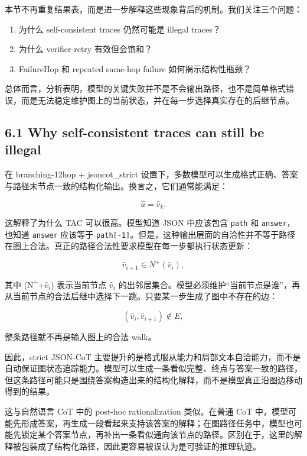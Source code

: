 \documentclass[
  11pt,
]{article}
\begin{document}
本节不再重复结果表，而是进一步解释这些现象背后的机制。我们关注三个问题：

\begin{enumerate}
\def\labelenumi{\arabic{enumi}.}
\item
  为什么 self-consistent traces 仍然可能是 illegal traces？
\item
  为什么 verifier-retry 有效但会饱和？
\item
  FailureHop 和 repeated same-hop failure 如何揭示结构性瓶颈？
\end{enumerate}

总体而言，分析表明，模型的关键失败并不是不会输出路径，也不是简单格式错误，而是无法稳定维护图上的当前状态，并在每一步选择真实存在的后继节点。

\subsection{6.1 Why self-consistent traces can still be
illegal}\label{why-self-consistent-traces-can-still-be-illegal}

在 branching-12hop + jsoncot\_strict
设置下，多数模型可以生成格式正确、答案与路径末节点一致的结构化输出。换言之，它们通常能满足：

\[
\hat{a}=\hat{v}_k.  
\]

这解释了为什么 TAC 可以很高。模型知道 JSON 中应该包含 \texttt{path} 和
\texttt{answer}，也知道 \texttt{answer} 应该等于
\texttt{path{[}-1{]}}。但是，这种输出层面的自洽性并不等于路径在图上合法。真正的路径合法性要求模型在每一步都执行状态更新：

\[
\hat{v}_{i+1}\in N^+(\hat{v}_i),  
\]

其中 (N\^{}+\(\hat{v}_i\)) 表示当前节点 \(\hat{v}_i\)
的出邻居集合。模型必须维护``当前节点是谁''，再从当前节点的合法后继中选择下一跳。只要某一步生成了图中不存在的边：

\[
(\hat{v}_i,\hat{v}_{i+1})\notin E,  
\]

整条路径就不再是输入图上的合法 walk。

因此，strict JSON-CoT
主要提升的是格式服从能力和局部文本自洽能力，而不是自动保证图状态追踪能力。模型可以生成一条看似完整、终点与答案一致的路径，但这条路径可能只是围绕答案构造出来的结构化解释，而不是模型真正沿图边移动得到的结果。

这与自然语言 CoT 中的 post-hoc rationalization 类似。在普通 CoT
中，模型可能先形成答案，再生成一段看起来支持该答案的解释；在图路径任务中，模型也可能先锁定某个答案节点，再补出一条看似通向该节点的路径。区别在于，这里的解释被包装成了结构化路径，因此更容易被误认为是可验证的推理轨迹。
\end{document}
